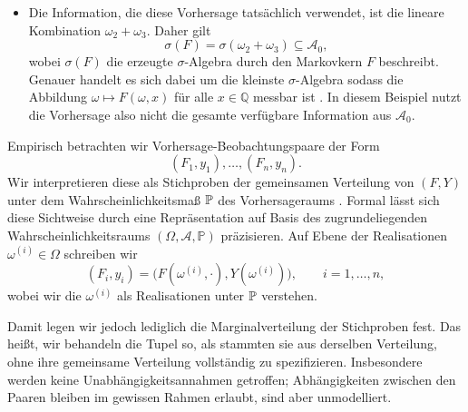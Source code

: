 \begin{bsp}[Vorhersageraum]
\begin{itemize}
    \[
    F:\Omega\times\mathcal B(\mathbb R)\to[0,1]
    \] 
    gegeben durch 
    \[
    F(\omega,\cdot)=\mathcal{N} \Big(\tfrac12(\omega_2+\omega_3),2\Big),
    \]
    wobei wir mit $\mathcal{N}(\mu,\sigma^2)$ eine Normalverteilung mit Mittelwert $\mu$ und Varianz $\sigma^2$ bezeichnen.
    \item Die Information, die diese Vorhersage tatsächlich verwendet, ist die lineare Kombination $\omega_2+\omega_3$. Daher gilt
    \[
    \sigma(F)=\sigma(\omega_2+\omega_3)\subseteq \mathcal{A}_0,
    \]
    wobei $\sigma(F)$ die erzeugte $\sigma$-Algebra durch den Markovkern $F$ beschreibt. Genauer handelt es sich dabei um die kleinste $\sigma$-Algebra sodass die Abbildung $\omega \mapsto F(\omega,x)$ für alle $x \in \mathbb{Q}$ messbar ist \parencite{strahl2017cross}. In diesem Beispiel nutzt die Vorhersage also nicht die gesamte verfügbare Information aus $\mathcal A_0$.
\end{itemize}
 
\end{bsp}{}

\noindent
Empirisch betrachten wir Vorhersage-Beobachtungspaare der Form
\begin{equation}\label{eq:stich}
    (F_1,y_1),\dotsc,(F_n,y_n).
\end{equation}Wir interpretieren diese als Stichproben der gemeinsamen Verteilung von $(F,Y)$ unter dem Wahrscheinlichkeitsmaß $\mathbb{P}$ des Vorhersageraums \parencite{gneiting2023regression}.
Formal lässt sich diese Sichtweise durch eine Repräsentation auf Basis des zugrundeliegenden Wahrscheinlichkeitsraums $(\Omega, \mathcal{A}, \mathbb{P})$  präzisieren. Auf Ebene der Realisationen $\omega^{(i)} \in \Omega$ schreiben wir
\[
(F_i,y_i)
=\bigl(F(\omega^{(i)},\cdot),Y(\omega^{(i)})\bigr),\qquad i=1,\dotsc,n,
\]
wobei wir die $\omega^{(i)}$ als Realisationen unter $\mathbb{P}$ verstehen. 

Damit legen wir jedoch lediglich die Marginalverteilung der Stichproben fest. Das heißt, wir behandeln die Tupel so, als stammten sie aus derselben Verteilung, ohne ihre gemeinsame Verteilung vollständig zu spezifizieren. Insbesondere werden keine Unabhängigkeitsannahmen getroffen; Abhängigkeiten zwischen den Paaren bleiben im gewissen Rahmen erlaubt, sind aber unmodelliert.

